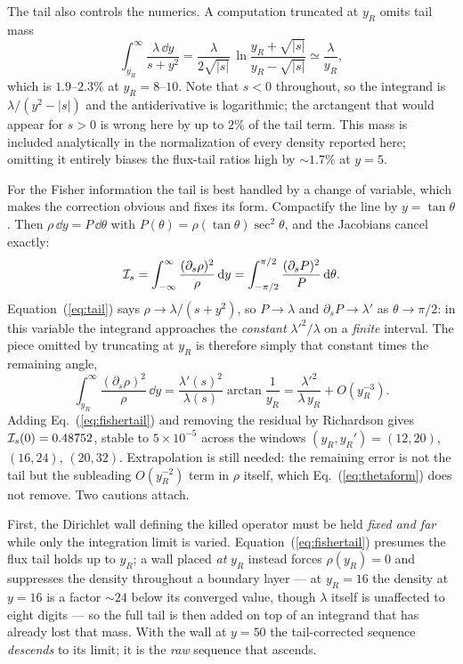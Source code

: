 The tail also controls the numerics.  A computation truncated at $y_R$ omits tail mass
\begin{equation}
\label{eq:tailmass}
\int_{y_R}^\infty\frac{\lambda\,\dd y}{s+y^2}
=\frac{\lambda}{2\sqrt{|s|}}\,\ln\frac{y_R+\sqrt{|s|}}{y_R-\sqrt{|s|}}
\simeq\frac{\lambda}{y_R},
\end{equation}
which is $1.9$--$2.3\%$ at $y_R=8$--$10$.  Note that $s<0$ throughout, so the integrand is $\lambda/(y^2-|s|)$ and the antiderivative is logarithmic; the arctangent that would appear for $s>0$ is wrong here by up to $2\%$ of the tail term.  This mass is included analytically in the normalization of every density reported here; omitting it entirely biases the flux-tail ratios high by ${\sim}1.7\%$ at $y=5$.

For the Fisher information the tail is best handled by a change of variable, which makes the correction obvious and fixes its form.  Compactify the line by $y=\tan\theta$.  Then $\rho\,\dd y=P\,\dd\theta$ with $P(\theta)=\rho(\tan\theta)\sec^2\theta$, and the Jacobians cancel exactly:
\begin{equation}
\label{eq:thetaform}
\mathcal{I}_s=\int_{-\infty}^{\infty}\frac{(\partial_s\rho)^2}{\rho}\,\mathrm{d} y
=\int_{-\pi/2}^{\pi/2}\frac{(\partial_sP)^2}{P}\,\mathrm{d}\theta .
\end{equation}
Equation~(\ref{eq:tail}) says $\rho\to\lambda/(s+y^2)$, so $P\to\lambda$ and $\partial_sP\to\lambda'$ as $\theta\to\pi/2$: in this variable the integrand approaches the \emph{constant} $\lambda'^2/\lambda$ on a \emph{finite} interval.  The piece omitted by truncating at $y_R$ is therefore simply that constant times the remaining angle,
\begin{equation}
\label{eq:fishertail}
\int_{y_R}^{\infty}\frac{(\partial_s\rho)^2}{\rho}\,\dd y
=\frac{\lambda'(s)^2}{\lambda(s)}\arctan\frac{1}{y_R}
=\frac{\lambda'^2}{\lambda\,y_R}+O(y_R^{-3}).
\end{equation}
Adding Eq.~(\ref{eq:fishertail}) and removing the residual by Richardson gives $\mathcal{I}_s(0)=0.48752$, stable to $5\times10^{-5}$ across the windows $(y_R,y_R')=(12,20)$, $(16,24)$, $(20,32)$.  Extrapolation is still needed: the remaining error is not the tail but the subleading $O(y_R^{-2})$ term in $\rho$ itself, which Eq.~(\ref{eq:thetaform}) does not remove.  Two cautions attach.

First, the Dirichlet wall defining the killed operator must be held \emph{fixed and far} while only the integration limit is varied.  Equation~(\ref{eq:fishertail}) presumes the flux tail holds up to $y_R$; a wall placed \emph{at} $y_R$ instead forces $\rho(y_R)=0$ and suppresses the density throughout a boundary layer --- at $y_R=16$ the density at $y=16$ is a factor ${\sim}24$ below its converged value, though $\lambda$ itself is unaffected to eight digits --- so the full tail is then added on top of an integrand that has already lost that mass.  With the wall at $y=50$ the tail-corrected sequence \emph{descends} to its limit; it is the \emph{raw} sequence that ascends.

